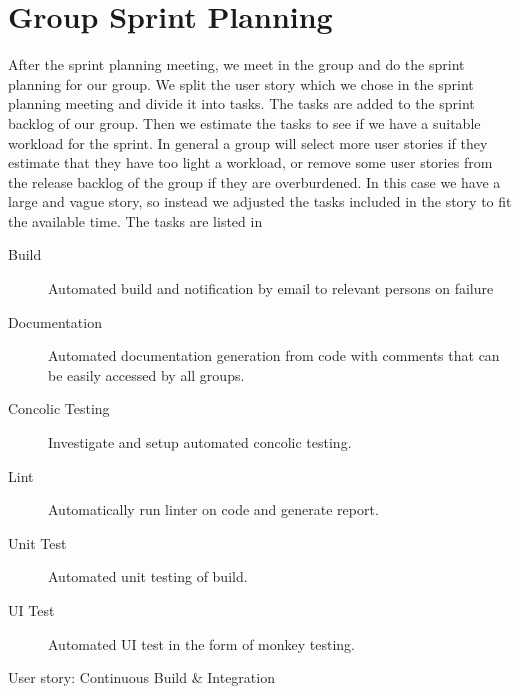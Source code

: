 \section{Group Sprint Planning}\label{sec:group_sprint_planning}
After the \bd sprint planning meeting, we meet in the group and do the sprint planning for our group. We split the user story which we chose in the \bd sprint planning meeting and divide it into tasks. The tasks are added to the sprint backlog of our group. Then we estimate the tasks to see if we have a suitable workload for the sprint. In general a group will select more user stories if they estimate that they have too light a workload, or remove some user stories from the release backlog of the group if they are overburdened. In this case we have a large and vague story, so instead we adjusted the tasks included in the story to fit the available time. The tasks are listed in  

\begin{description}
    \item[Build] Automated build and notification by email to relevant persons on failure
    \item[Documentation] Automated documentation generation from code with comments that can be easily accessed by all groups.
    \item[Concolic Testing] Investigate and setup automated concolic testing.
    \item[Lint] Automatically run linter on code and generate report.
    \item[Unit Test] Automated unit testing of build.
    \item[UI Test] Automated UI test in the form of monkey testing.
\end{description}

User story: Continuous Build \& Integration

